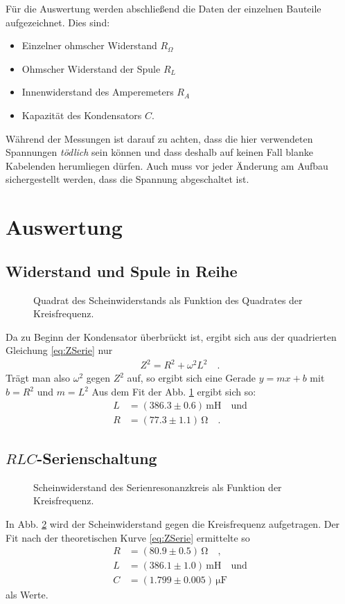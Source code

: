 \documentclass[12pt,a4paper,titlepage,headinclude,bibtotoc]{scrartcl}
\begin{document}
Für die Auswertung werden abschließend die Daten der einzelnen Bauteile aufgezeichnet.
Dies sind:
\begin{itemize}
\item Einzelner ohmscher Widerstand $R_\Omega$
\item Ohmscher Widerstand der Spule $R_L$
\item Innenwiderstand des Amperemeters $R_A$
\item Kapazität des Kondensators $C$.
\end{itemize}

Während der Messungen ist darauf zu achten, dass die hier verwendeten Spannungen \emph{tödlich} sein können und dass deshalb auf keinen Fall blanke Kabelenden herumliegen dürfen.
Auch muss vor jeder Änderung am Aufbau sichergestellt werden, dass die Spannung abgeschaltet ist.

\newpage
\section{Auswertung}
\label{sec:auswertung}
\subsection{Widerstand und Spule in Reihe}
\begin{figure}[!htb]
	\centering
	
	\caption{Quadrat des Scheinwiderstands als Funktion des Quadrates der Kreisfrequenz.}
	\label{fig:messung1}
\end{figure}
Da zu Beginn der Kondensator überbrückt ist, ergibt sich aus der quadrierten Gleichung \eqref{eq:ZSerie} nur
\begin{align*}
Z^2=R^2+\omega^2L^2\quad .
\end{align*}
Trägt man also $\omega^2$ gegen $Z^2$ auf, so ergibt sich eine Gerade $y=mx+b$ mit $b=R^2$ und $m=L^2$
Aus dem Fit der Abb. \ref{fig:messung1} ergibt sich so:
\begin{align*}
	L&=(386.3\pm 0.6)\,\si{\milli\henry}\quad \text{und}\\
	R&=(77.3 \pm 1.1)\,\si{\ohm}\quad .
\end{align*}
\subsection{$RLC$-Serienschaltung}
\begin{figure}[!htb]
	\centering
	
	\caption{Scheinwiderstand des Serienresonanzkreis als Funktion der Kreisfrequenz.}
	\label{fig:messung2}
\end{figure}
In Abb. \ref{fig:messung2} wird der Scheinwiderstand gegen die Kreisfrequenz aufgetragen.
Der Fit nach der theoretischen Kurve \eqref{eq:ZSerie} ermittelte so 
\begin{align*}
	R &= (80.9 \pm 0.5)\,\si{\ohm}\quad ,\\
	L &= (386.1 \pm 1.0)\,\si{\milli\henry}\quad \text{und}\\
	C &= (1.799 \pm 0.005)\,\si{\micro\farad}
\end{align*}
als Werte.\\
\end{document}
